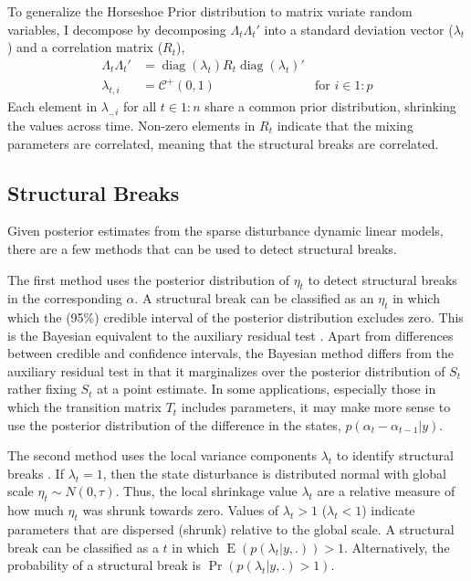 \documentclass{article}
\newcommand{\dist}[1]{\mathcal{#1}}
\newcommand{\paren}[1]{\ensuremath{\left(#1\right)}}
\newcommand{\dhalfcauchy}[1]{\ensuremath{\dist{C}^{+}\paren{#1}}}
\DeclareMathOperator{\E}{E}
\DeclareMathOperator{\diag}{diag}
\begin{document}
To generalize the Horseshoe Prior distribution to matrix variate random variables, I decompose by decomposing $\Lambda_{t} \Lambda_{t}'$ into a standard deviation vector ($\lambda_{t}$) and a correlation matrix ($R_{t}$),%
\begin{align}
  \label{eq:16}
  \Lambda_{t} \Lambda_{t}' &= \diag(\lambda_{t}) R_{t} \diag(\lambda_{t})' \\
  \label{eq:17}
  \lambda_{t,i} &= \dhalfcauchy{0, 1} & \text{for $i \in 1:p$}
\end{align}
Each element in $\lambda_{.,i}$ for all $t \in 1:n$ share a common prior distribution, shrinking the values across time.
Non-zero elements in $R_{t}$ indicate that the mixing parameters are correlated, meaning that the structural breaks are correlated.

\subsection{Structural Breaks}

Given posterior estimates from the sparse disturbance dynamic linear models, there are a few methods that can be used to detect structural breaks.

The first method uses the posterior distribution of $\eta_{t}$ to detect structural breaks in the corresponding $\alpha$.
A structural break can be classified as an $\eta_{t}$ in which which the (95\%) credible interval of the posterior distribution excludes zero.
This is the Bayesian equivalent to the auxiliary residual test \parencites{JongPenzer1998}{DurbinKoopman2001}.%
Apart from differences between credible and confidence intervals, the Bayesian method differs from the auxiliary residual test in that it marginalizes over the posterior distribution of $S_{t}$ rather fixing $S_{t}$ at a point estimate.
In some applications, especially those in which the transition matrix $T_{t}$ includes parameters, it may make more sense to use the posterior distribution of the difference in the states, $p(\alpha_{t} - \alpha_{t - 1} | y)$.

The second method uses the local variance components $\lambda_{t}$ to identify structural breaks \parencite[179-180]{PetrisPetroneEtAl2009}.
If $\lambda_{t} = 1$, then the state disturbance is distributed normal with global scale $\eta_{t} \sim N(0, \tau)$.
Thus, the local shrinkage value $\lambda_{t}$ are a relative measure of how much $\eta_{t}$ was shrunk towards zero.
Values of $\lambda_{t} > 1$ ($\lambda_{t} < 1$) indicate parameters that are dispersed (shrunk) relative to the global scale.
A structural break can be classified as a $t$ in which $\E (p(\lambda_{t} | y, .)) > 1$.
Alternatively, the probability of a structural break is $\Pr(p(\lambda_{t} | y, .) > 1)$.
\end{document}
